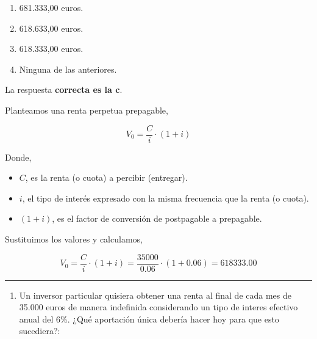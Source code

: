 \documentclass[
  letterpaper,
  DIV=11,
  numbers=noendperiod]{scrreprt}
\providecommand{\tightlist}{%
  \setlength{\itemsep}{0pt}\setlength{\parskip}{0pt}}\usepackage{longtable,booktabs,array}
\begin{document}
\begin{enumerate}
\def\labelenumi{\alph{enumi}.}
\item
  681.333,00 euros.
\item
  618.633,00 euros.
\item
  618.333,00 euros.
\item
  Ninguna de las anteriores.
\end{enumerate}

\begin{tcolorbox}[enhanced jigsaw, left=2mm, opacityback=0, colback=white, breakable, arc=.35mm, bottomrule=.15mm, rightrule=.15mm, toprule=.15mm, leftrule=.75mm, colframe=quarto-callout-tip-color-frame]
\begin{minipage}[t]{5.5mm}
\textcolor{quarto-callout-tip-color}{\faLightbulb}
\end{minipage}%
\begin{minipage}[t]{\textwidth - 5.5mm}

La respuesta \textbf{correcta es la c}.

Planteamos una renta perpetua prepagable,

\[V_0=\frac{C}{i}\cdot(1+i)\]

Donde,

\begin{itemize}
\item
  \(C\), es la renta (o cuota) a percibir (entregar).
\item
  \(i\), el tipo de interés expresado con la misma frecuencia que la
  renta (o cuota).
\item
  \((1+i)\), es el factor de conversión de postpagable a prepagable.
\end{itemize}

Sustituimos los valores y calculamos,

\[V_0=\frac{C}{i}\cdot(1+i)=\frac{35000}{0.06}\cdot(1+0.06)=618333.00\]

\end{minipage}%
\end{tcolorbox}

\begin{center}\rule{0.5\linewidth}{0.5pt}\end{center}

\begin{enumerate}
\def\labelenumi{\arabic{enumi}.}
\setcounter{enumi}{90}
\tightlist
\item
  Un inversor particular quisiera obtener una renta al final de cada mes
  de 35.000 euros de manera indefinida considerando un tipo de interes
  efectivo anual del 6\%. ¿Qué aportación única debería hacer hoy para
  que esto sucediera?:
\end{enumerate}
\end{document}
